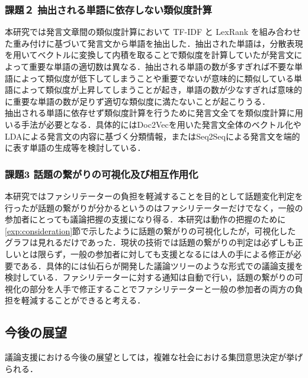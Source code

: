 \subsubsection*{課題２ 抽出される単語に依存しない類似度計算}
本研究では発言文章間の類似度計算において TF-IDF と LexRank を組み合わせた重み付けに基づいて発言文から単語を抽出した．抽出された単語は，分散表現を用いてベクトルに変換して内積を取ることで類似度を計算していたが発言文によって重要な単語の適切数は異なる．抽出される単語の数が多すぎれば不要な単語によって類似度が低下してしまうことや重要でないが意味的に類似している単語によって類似度が上昇してしまうことが起き，単語の数が少なすぎれば意味的に重要な単語の数が足りず適切な類似度に満たないことが起こりうる．
\\
抽出される単語に依存せず類似度計算を行うために発言文全てを類似度計算に用いる手法が必要となる．具体的にはDoc2Vec\cite{doc2vec2014}を用いた発言文全体のベクトル化やLDAによる発言文の内容に基づく分類情報，またはSeq2Seq\cite{seq2seq2014}による発言文を端的に表す単語の生成等を検討している．

\subsubsection*{課題3 話題の繋がりの可視化及び相互作用化}
本研究ではファシリテーターの負担を軽減することを目的として話題変化判定を行ったが話題の繋がりが分かるというのはファシリテーターだけでなく，一般の参加者にとっても議論把握の支援になり得る．本研究は動作の把握のために\ref{exp:consideration}節で示したように話題の繋がりの可視化したが，可視化したグラフは見れるだけであった．現状の技術では話題の繋がりの判定は必ずしも正しいとは限らず，一般の参加者に対しても支援となるには人の手による修正が必要である．具体的には仙石らが開発した議論ツリーのような形式での議論支援を検討している．ファシリテーターに対する通知は自動で行い，話題の繋がりの可視化の部分を人手で修正することでファシリテーターと一般の参加者の両方の負担を軽減することができると考える．

\subsection{今後の展望}
\label{con:future}
議論支援における今後の展望としては，複雑な社会における集団意思決定が挙げられる．

